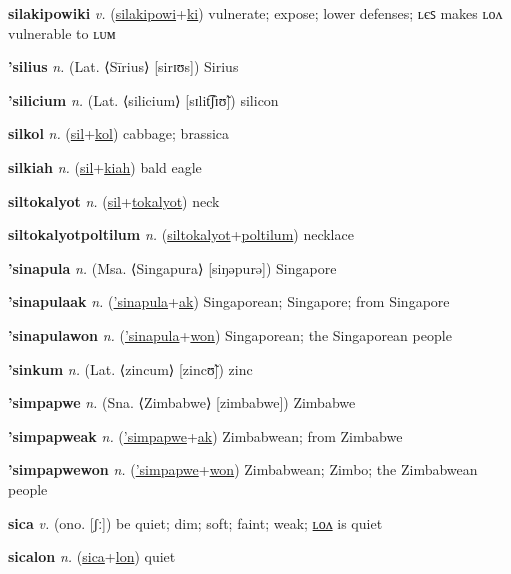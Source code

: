 \textbf{\hypertarget{silakipowiki}{silakipowiki}} \textit{v.} (\hyperlink{silakipowi}{silakipowi}+\allowbreak \hyperlink{ki}{ki})
vulnerate; expose; lower defenses; ʟєꜱ makes ʟᴏᴧ vulnerable to ʟᴜᴍ

\textbf{\hypertarget{'silius}{'silius}} \textit{n.} (Lat. ⟨Sīrius⟩ [sirɪʊs])
Sirius

\textbf{\hypertarget{'silicium}{'silicium}} \textit{n.} (Lat. ⟨silicium⟩ [sɪlit͡ʃɪʊ̃])
silicon

\textbf{\hypertarget{silkol}{silkol}} \textit{n.} (\hyperlink{sil}{sil}+\allowbreak \hyperlink{kol}{kol})
cabbage; brassica

\textbf{\hypertarget{silkiah}{silkiah}} \textit{n.} (\hyperlink{sil}{sil}+\allowbreak \hyperlink{kiah}{kiah})
bald eagle

\textbf{\hypertarget{siltokalyot}{siltokalyot}} \textit{n.} (\hyperlink{sil}{sil}+\allowbreak \hyperlink{tokalyot}{tokalyot})
neck

\textbf{\hypertarget{siltokalyotpoltilum}{siltokalyotpoltilum}} \textit{n.} (\hyperlink{siltokalyot}{siltokalyot}+\allowbreak \hyperlink{poltilum}{poltilum})
necklace

\textbf{\hypertarget{'sinapula}{'sinapula}} \textit{n.} (Msa. ⟨Singapura⟩ [siŋəpurə])
Singapore

\textbf{\hypertarget{'sinapulaak}{'sinapulaak}} \textit{n.} (\hyperlink{'sinapula}{'sinapula}+\allowbreak \hyperlink{ak}{ak})
Singaporean; Singapore; from Singapore

\textbf{\hypertarget{'sinapulawon}{'sinapulawon}} \textit{n.} (\hyperlink{'sinapula}{'sinapula}+\allowbreak \hyperlink{won}{won})
Singaporean; the Singaporean people

\textbf{\hypertarget{'sinkum}{'sinkum}} \textit{n.} (Lat. ⟨zincum⟩ [zincʊ̃])
zinc

\textbf{\hypertarget{'simpapwe}{'simpapwe}} \textit{n.} (Sna. ⟨Zimbabwe⟩ [zimbabwe])
Zimbabwe

\textbf{\hypertarget{'simpapweak}{'simpapweak}} \textit{n.} (\hyperlink{'simpapwe}{'simpapwe}+\allowbreak \hyperlink{ak}{ak})
Zimbabwean; from Zimbabwe

\textbf{\hypertarget{'simpapwewon}{'simpapwewon}} \textit{n.} (\hyperlink{'simpapwe}{'simpapwe}+\allowbreak \hyperlink{won}{won})
Zimbabwean; Zimbo; the Zimbabwean people

\textbf{\hypertarget{sica}{sica}} \textit{v.} (ono. [ʃː])
be quiet; dim; soft; faint; weak; \hyperlink{sicalon}{ʟᴏᴧ} is quiet

\textbf{\hypertarget{sicalon}{sicalon}} \textit{n.} (\hyperlink{sica}{sica}+\allowbreak \hyperlink{lon}{lon})
quiet

